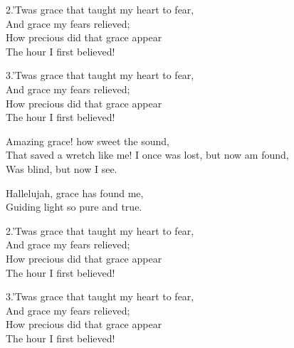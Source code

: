 \documentclass[12pt]{article}
\begin{document}
\begin{stanza}
2.’Twas grace that taught my heart to fear,\\
And grace my fears relieved;\\
How precious did that grace appear\\
The hour I first believed!
\end{stanza}

\begin{stanza}
3.’Twas grace that taught my heart to fear,\\
And grace my fears relieved;\\
How precious did that grace appear\\
The hour I first believed!
\end{stanza}



\begin{stanza}
Amazing grace! how sweet the sound,\\
That saved a wretch like me!
I once was lost, but now am found,\\
Was blind, but now I see.
\end{stanza}

\begin{chorus}
Hallelujah, grace has found me,\\
Guiding light so pure and true.
\end{chorus}

\begin{stanza}
2.’Twas grace that taught my heart to fear,\\
And grace my fears relieved;\\
How precious did that grace appear\\
The hour I first believed!
\end{stanza}

\begin{stanza}
3.’Twas grace that taught my heart to fear,\\
And grace my fears relieved;\\
How precious did that grace appear\\
The hour I first believed!
\end{stanza}


\newpage
\tableofcontents
\end{document}
